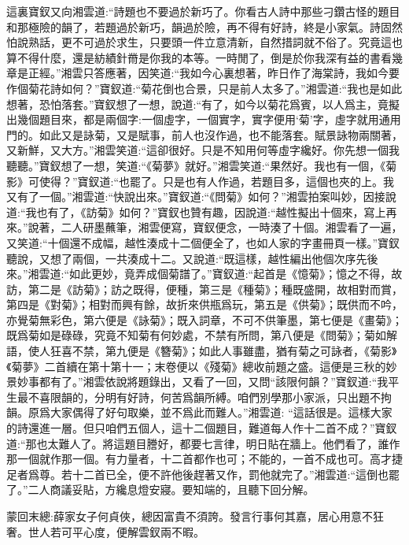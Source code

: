 \begin{parag}
    這裏寶釵又向湘雲道:“詩題也不要過於新巧了。你看古人詩中那些刁鑽古怪的題目和那極險的韻了，若題過於新巧，韻過於險，再不得有好詩，終是小家氣。詩固然怕說熟話，更不可過於求生，只要頭一件立意清新，自然措詞就不俗了。究竟這也算不得什麼，還是紡績針黹是你我的本等。一時閒了，倒是於你我深有益的書看幾章是正經。”湘雲只答應著，因笑道:“我如今心裏想著，昨日作了海棠詩，我如今要作個菊花詩如何？”寶釵道:“菊花倒也合景，只是前人太多了。”湘雲道:“我也是如此想著，恐怕落套。”寶釵想了一想，說道:“有了，如今以菊花爲賓，以人爲主，竟擬出幾個題目來，都是兩個字:一個虛字，一個實字，實字便用‘菊’字，虛字就用通用門的。如此又是詠菊，又是賦事，前人也沒作過，也不能落套。賦景詠物兩關著，又新鮮，又大方。”湘雲笑道:“這卻很好。只是不知用何等虛字纔好。你先想一個我聽聽。”寶釵想了一想，笑道:“《菊夢》就好。”湘雲笑道:“果然好。我也有一個，《菊影》可使得？”寶釵道:“也罷了。只是也有人作過，若題目多，這個也夾的上。我又有了一個。”湘雲道:“快說出來。”寶釵道:“《問菊》如何？”湘雲拍案叫妙，因接說道:“我也有了，《訪菊》如何？”寶釵也贊有趣，因說道:“越性擬出十個來，寫上再來。”說著，二人研墨蘸筆，湘雲便寫，寶釵便念，一時湊了十個。湘雲看了一遍，又笑道:“十個還不成幅，越性湊成十二個便全了，也如人家的字畫冊頁一樣。”寶釵聽說，又想了兩個，一共湊成十二。又說道:“既這樣，越性編出他個次序先後來。”湘雲道:“如此更妙，竟弄成個菊譜了。”寶釵道:“起首是《憶菊》；憶之不得，故訪，第二是《訪菊》；訪之既得，便種，第三是《種菊》；種既盛開，故相對而賞，第四是《對菊》；相對而興有餘，故折來供瓶爲玩，第五是《供菊》；既供而不吟，亦覺菊無彩色，第六便是《詠菊》；既入詞章，不可不供筆墨，第七便是《畫菊》；既爲菊如是碌碌，究竟不知菊有何妙處，不禁有所問，第八便是《問菊》；菊如解語，使人狂喜不禁，第九便是《簪菊》；如此人事雖盡，猶有菊之可詠者，《菊影》《菊夢》二首續在第十第十一；末卷便以《殘菊》總收前題之盛。這便是三秋的妙景妙事都有了。”湘雲依說將題錄出，又看了一回，又問“該限何韻？”寶釵道:“我平生最不喜限韻的，分明有好詩，何苦爲韻所縛。咱們別學那小家派，只出題不拘韻。原爲大家偶得了好句取樂，並不爲此而難人。”湘雲道: “這話很是。這樣大家的詩還進一層。但只咱們五個人，這十二個題目，難道每人作十二首不成？”寶釵道:“那也太難人了。將這題目謄好，都要七言律，明日貼在牆上。他們看了，誰作那一個就作那一個。有力量者，十二首都作也可；不能的，一首不成也可。高才捷足者爲尊。若十二首已全，便不許他後趕著又作，罰他就完了。”湘雲道:“這倒也罷了。”二人商議妥貼，方纔息燈安寢。要知端的，且聽下回分解。
\end{parag}


\begin{parag}
    \begin{note}蒙回末總:薛家女子何貞俠，總因富貴不須誇。發言行事何其嘉，居心用意不狂奢。世人若可平心度，便解雲釵兩不暇。\end{note}
\end{parag}

